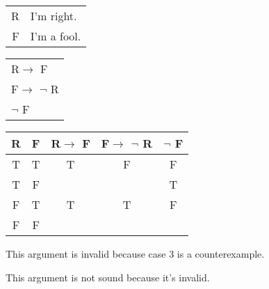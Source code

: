 \section{}
\centering
\begin{tabular}{r l}
    R & I'm right. \\
    F & I'm a fool.
\end{tabular}
\begin{tabular}{l}
    R$\rightarrow$ F\\
    F$\rightarrow$ $\lnot$ R\\
    \hline
    $\lnot$ F
\end{tabular}

\begin{tabular}{c|c||c|c||c}
    R & F & R$\rightarrow$ F & F$\rightarrow$ $\lnot$ R & $\lnot$ F \\
    \hline
    T & T & T & F & F \\
    T & F &   &   & T \\
    F & T & T & T & F \\
    F & F &   &   &  
\end{tabular}

\justifying
\noindent This argument is invalid because case 3 is a counterexample.

\noindent This argument is not sound because it's invalid.